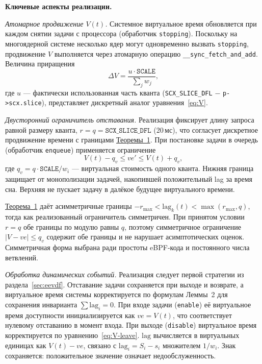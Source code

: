 \documentclass[14pt, oneside]{extbook}
\begin{document}
        \textbf{Ключевые аспекты реализации.}

        \textit{Атомарное продвижение $V(t)$.}
        Системное виртуальное время обновляется при каждом снятии
        задачи с процессора (обработчик \texttt{stopping}).
        Поскольку на многоядерной системе несколько ядер могут
        одновременно вызвать \texttt{stopping}, продвижение $V$
        выполняется через атомарную операцию
        \texttt{\_\_sync\_fetch\_and\_add}. Величина приращения
        \begin{equation*}
                \Delta V = \frac{u \cdot \texttt{SCALE}}{\sum_{j} w_j},
        \end{equation*}
        где $u$ --- фактически использованная часть кванта
        (\texttt{SCX\_SLICE\_DFL} $-$ \texttt{p->scx.slice}),
        представляет дискретный аналог уравнения~\eqref{eq:V}.

        \textit{Двусторонний ограничитель отставания.}
        Реализация фиксирует длину запроса равной размеру кванта,
        $r = q = \texttt{SCX\_SLICE\_DFL}$ (20\,мс), что согласует
        дискретное продвижение времени с границами
        \hyperlink{thm:lag-bound}{Теоремы~1}.
        При постановке задачи в очередь (обработчик \texttt{enqueue})
        применяется ограничение
        \[
                V(t) - q_v \leq ve' \leq V(t) + q_v,
        \]
        где $q_v = q \cdot \texttt{SCALE} / w_i$ --- виртуальная
        стоимость одного кванта. Нижняя граница защищает от
        монополизации задачей, накопившей положительный lag
        за время сна. Верхняя не пускает задачу в далёкое
        будущее виртуального времени.

        \hyperlink{thm:lag-bound}{Теорема~1} даёт асимметричные границы
        $-r_{\max} < \mathrm{lag}_k(t) < \max(r_{\max}, q)$,
        тогда как реализованный ограничитель симметричен. При
        принятом условии $r = q$ обе границы по модулю равны $q$,
        поэтому симметричное ограничение
        $|V - ve| \leq q_v$
        содержит обе границы и не нарушает асимптотических
        оценок. Симметричная форма выбрана ради простоты
        eBPF-кода и постоянного числа ветвлений.

        \textit{Обработка динамических событий.}
        Реализация следует первой стратегии из
        раздела~\ref{sec:eevdf}. Отставание задачи сохраняется
        при выходе и возврате, а виртуальное время системы
        корректируется по формулам Леммы~2 для сохранения инварианта
        $\sum \mathrm{lag}_i = 0$. При входе задачи (\texttt{enable})
        её виртуальное время доступности инициализируется как
        $ve = V(t)$, что соответствует нулевому отставанию в момент
        входа. При выходе
        (\texttt{disable}) виртуальное время корректируется
        по уравнению~\eqref{eq:V-leave}.
        $\mathrm{lag}$ вычисляется в виртуальных единицах как
        $V(t) - ve$, связано с $\mathrm{lag}_i = S_i - s_i$
        множителем $1/w_i$. Знак сохраняется: положительное
        значение означает недообслуженность.
\end{document}
